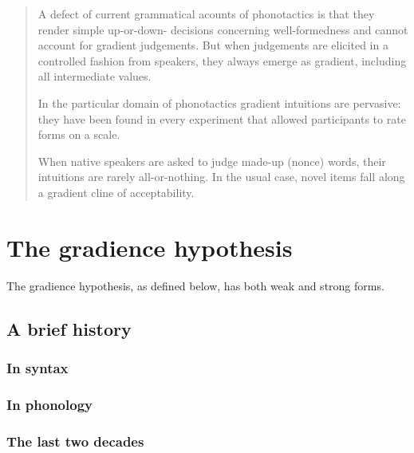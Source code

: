 \citep[e.g.,][]{Pertz1975,Albright2007}



\begin{quote}
A defect of current grammatical acounts of phonotactics is that they render simple up-or-down- decisions concerning well-formedness and cannot account for gradient judgements. But when judgements are elicited in a controlled fashion from speakers, they always emerge as gradient, including all intermediate values. \citep[][371]{Shademan2006}

In the particular domain of phonotactics gradient intuitions are pervasive: they have been found in every experiment that allowed participants to rate forms on a scale.
\citep[][382]{Hayes2008a}

When native speakers are asked to judge made-up (nonce) words, their intuitions are rarely all-or-nothing. In the usual case, novel items fall along a gradient cline of acceptability. \citep[][9]{Albright2009a}
\end{quote}


\section{The gradience hypothesis}

The gradience hypothesis, as defined below, has both weak and strong forms.

\subsection{A brief history}
\subsubsection{In syntax}
\subsubsection{In phonology}
\subsubsection{The last two decades}
